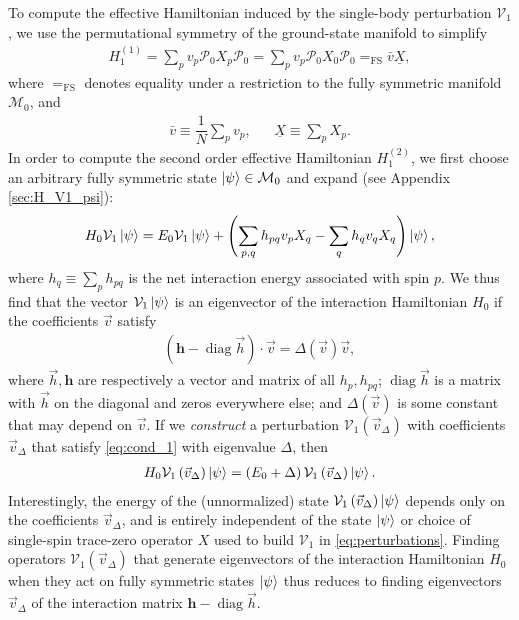 \documentclass[nofootinbib,notitlepage,11pt]{revtex4-2}
\newcommand{\f}[2]{\dfrac{#1}{#2}} %
\newcommand{\p}[1]{\left(#1\right)} %
\renewcommand{\c}{\cdot} %
\newcommand{\m}{\bm} %
\renewcommand{\v}{\vec} %
\newcommand{\1}{\mathds{1}}
\newcommand{\M}{\mathcal{M}}
\renewcommand{\P}{\mathcal{P}}
\newcommand{\V}{\mathcal{V}}
\newcommand{\EQFS}{=_{\text{FS}}}
\newcommand{\col}{\underline}
\DeclareMathOperator{\diag}{diag}
\begin{document}
To compute the effective Hamiltonian induced by the single-body
perturbation $\V_1$, we use the permutational symmetry of the
ground-state manifold to simplify
\begin{align}
  H_1^{(1)} = \sum_p v_p \P_0 X_p \P_0
  = \sum_p v_p \P_0 X_0 \P_0 \EQFS \bar v \col{X},
  \label{eq:H_1_1}
\end{align}
where $\EQFS$ denotes equality under a restriction to the fully
symmetric manifold $\M_0$, and
\begin{align}
  \bar v \equiv \f1N \sum_p v_p,
  &&
  \col{X} \equiv \sum_p X_p.
\end{align}
In order to compute the second order effective Hamiltonian
$H_1^{(2)}$, we first choose an arbitrary fully symmetric state
$\ket\psi\in\M_0$ and expand (see Appendix \ref{sec:H_V1_psi}):
\begin{align}
  H_0 \V_1 \ket\psi
  = E_0 \V_1 \ket\psi
  + \p{\sum_{p,q} h_{pq} v_p X_q - \sum_q h_q v_q X_q} \ket\psi,
  \label{eq:H_V1_psi}
\end{align}
where $h_q\equiv\sum_p h_{pq}$ is the net interaction energy
associated with spin $p$.  We thus find that the vector $\V_1\ket\psi$
is an eigenvector of the interaction Hamiltonian $H_0$ if the
coefficients $\v v$ satisfy
\begin{align}
  \p{\m h - \diag\v h}\c\v v = \Delta\p{\v v} \v v,
  \label{eq:cond_1}
\end{align}
where $\v h,\m h$ are respectively a vector and matrix of all
$h_p,h_{pq}$; $\diag\v h$ is a matrix with $\v h$ on the diagonal and
zeros everywhere else; and $\Delta\p{\v v}$ is some constant that may
depend on $\v v$.  If we {\it construct} a perturbation
$\V_1\p{\v v_\Delta}$ with coefficients $\v v_\Delta$ that satisfy
\eqref{eq:cond_1} with eigenvalue $\Delta$, then
\begin{align}
  H_0 \V_1\p{\v v_\Delta} \ket\psi
  = \p{E_0 + \Delta} \V_1\p{\v v_\Delta} \ket\psi.
\end{align}
Interestingly, the energy of the (unnormalized) state
$\V_1\p{\v v_\Delta}\ket\psi$ depends only on the coefficients
$\v v_\Delta$, and is entirely independent of the state $\ket\psi$ or
choice of single-spin trace-zero operator $X$ used to build $\V_1$ in
\eqref{eq:perturbations}.  Finding operators $\V_1\p{\v v_\Delta}$
that generate eigenvectors of the interaction Hamiltonian $H_0$ when
they act on fully symmetric states $\ket\psi$ thus reduces to finding
eigenvectors $\v v_\Delta$ of the interaction matrix $\m h-\diag\v h$.
\end{document}
